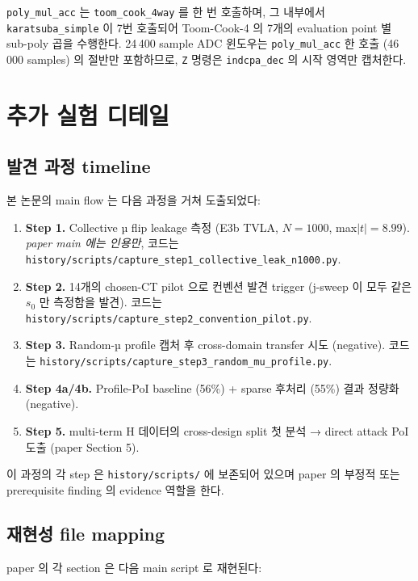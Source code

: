 \documentclass[11pt]{article}
\theoremstyle{plain}
\theoremstyle{definition}
\theoremstyle{remark}
\begin{document}
\texttt{poly\_mul\_acc} 는 \texttt{toom\_cook\_4way} 를 한 번 호출하며, 그
내부에서 \texttt{karatsuba\_simple} 이 7번 호출되어 Toom-Cook-4 의 7개의
evaluation point 별 sub-poly 곱을 수행한다. 24\,400 sample ADC 윈도우는
\texttt{poly\_mul\_acc} 한 호출 (46\,000 samples) 의 절반만 포함하므로,
\texttt{Z} 명령은 \texttt{indcpa\_dec} 의 시작 영역만 캡처한다.

\section{추가 실험 디테일}
\label{app:exp}

\subsection{발견 과정 timeline}

본 논문의 main flow 는 다음 과정을 거쳐 도출되었다:

\begin{enumerate}[leftmargin=*]
\item \textbf{Step 1.} Collective µ flip leakage 측정 (E3b TVLA, $N=1000$,
   max$|t|=8.99$). \emph{paper main 에는 인용만}, 코드는
   \texttt{history/scripts/capture\_step1\_collective\_leak\_n1000.py}.
\item \textbf{Step 2.} 14개의 chosen-CT pilot 으로 컨벤션 발견 trigger
   (j-sweep 이 모두 같은 $s_0$ 만 측정함을 발견). 코드는
   \texttt{history/scripts/capture\_step2\_convention\_pilot.py}.
\item \textbf{Step 3.} Random-µ profile 캡처 후 cross-domain transfer 시도
   (negative). 코드는
   \texttt{history/scripts/capture\_step3\_random\_mu\_profile.py}.
\item \textbf{Step 4a/4b.} Profile-PoI baseline (56\%) + sparse 후처리 (55\%)
   결과 정량화 (negative).
\item \textbf{Step 5.} multi-term H 데이터의 cross-design split 첫 분석 →
   direct attack PoI 도출 (paper Section 5).
\end{enumerate}

이 과정의 각 step 은 \texttt{history/scripts/} 에 보존되어 있으며 paper 의
부정적 또는 prerequisite finding 의 evidence 역할을 한다.

\subsection{재현성 file mapping}

paper 의 각 section 은 다음 main script 로 재현된다:
\end{document}
